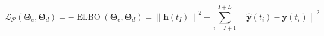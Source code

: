 \begin{equation}
\mathcal{L}_{\mathcal{P}}\left(\boldsymbol{\Theta}_{e}, \boldsymbol{\Theta}_{d}\right) =-\operatorname{ELBO}\left(\boldsymbol{\Theta}_{e}, \boldsymbol{\Theta}_{d}\right)
=\left\|\boldsymbol{h}\left(t_{I}\right)\right\|^{2}+\sum_{i=I+1}^{I+L}\left\|\hat{\boldsymbol{y}}\left(t_{i}\right)-\boldsymbol{y}\left(t_{i}\right)\right\|^{2}
\end{equation}

